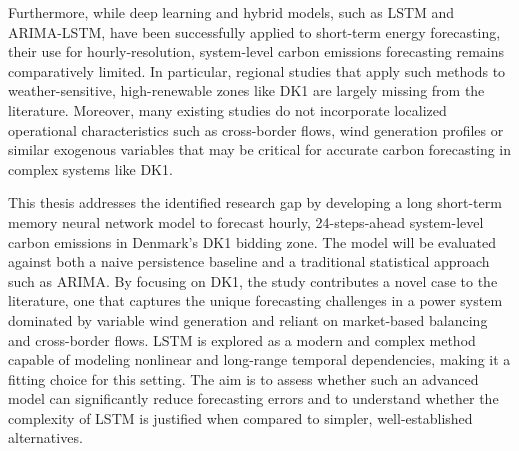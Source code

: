 Furthermore, while deep learning and hybrid models, such as LSTM and ARIMA-LSTM, have been successfully applied to short-term energy forecasting, their use for hourly-resolution, system-level carbon emissions forecasting remains comparatively limited. In particular, regional studies that apply such methods to weather-sensitive, high-renewable zones like DK1 are largely missing from the literature.  Moreover, many existing studies do not incorporate localized operational characteristics such as cross-border flows, wind generation profiles or similar exogenous variables that may be critical for accurate carbon forecasting in complex systems like DK1.

This thesis addresses the identified research gap by developing a long short-term memory neural network model to forecast hourly, 24-steps-ahead system-level carbon emissions in Denmark's DK1 bidding zone. The model will be evaluated against both a naive persistence baseline and a traditional statistical approach such as ARIMA. By focusing on DK1, the study contributes a novel case to the literature, one that captures the unique forecasting challenges in a power system dominated by variable wind generation and reliant on market-based balancing and cross-border flows. LSTM is explored as a modern and complex method capable of modeling nonlinear and long-range temporal dependencies, making it a fitting choice for this setting. The aim is to assess whether such an advanced model can significantly reduce forecasting errors and to understand whether the complexity of LSTM is justified when compared to simpler, well-established alternatives.
